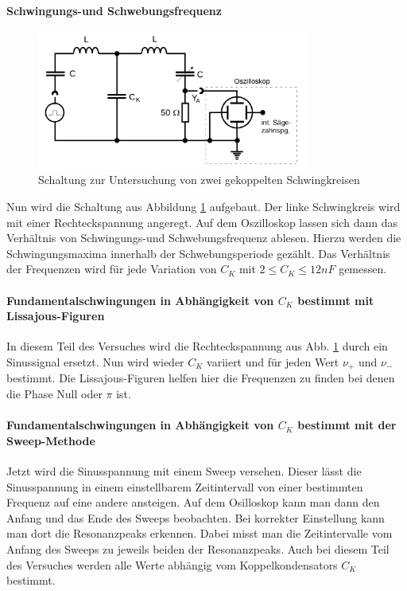 \paragraph{Schwingungs-und Schwebungsfrequenz}
\begin{figure}
  \centering
  \includegraphics[height = 4.5cm]{./logos/Abb6.png}
  \caption{Schaltung zur Untersuchung von zwei gekoppelten Schwingkreisen\cite{sample}}
  \label{fig:Abb6}
\end{figure}
\FloatBarrier
Nun wird die Schaltung aus Abbildung \ref{fig:Abb6} aufgebaut. Der linke Schwingkreis wird mit einer Rechteckspannung angeregt.
Auf dem Oszilloskop lassen sich dann das Verhältnis von Schwingungs-und Schwebungsfrequenz ablesen. Hierzu werden die Schwingungsmaxima innerhalb der Schwebungsperiode gezählt.
Das Verhältnis der Frequenzen wird für jede Variation von $C_K$ mit $ 2 \leq C_K \leq 12 nF $ gemessen.
\paragraph{Fundamentalschwingungen in Abhängigkeit von $C_K$  bestimmt mit Lissajous-Figuren}
  In diesem Teil des Versuches wird die Rechteckspannung aus Abb. \ref{fig:Abb6} durch ein Sinussignal ersetzt. Nun wird wieder $C_K$ variiert und für
  jeden Wert $ \nu_+$ und $\nu_-$ bestimmt. Die Lissajous-Figuren helfen hier die Frequenzen zu finden bei denen die Phase Null oder $ \pi $ ist.
\paragraph{Fundamentalschwingungen in Abhängigkeit von $C_K$  bestimmt mit der Sweep-Methode}
  Jetzt wird die Sinusspannung mit einem Sweep versehen. Dieser lässt die Sinusspannung in einem einstellbarem Zeitintervall von einer bestimmten Frequenz auf eine andere ansteigen.
  Auf dem Osilloskop kann man dann den Anfang und das Ende des Sweeps beobachten. Bei korrekter Einstellung kann man dort die Resonanzpeaks erkennen. Dabei misst man
  die Zeitintervalle vom Anfang des Sweeps zu jeweils beiden der Resonanzpeaks. Auch bei diesem Teil des Versuches werden alle Werte abhängig vom Koppelkondensators $ C_K$ bestimmt.

